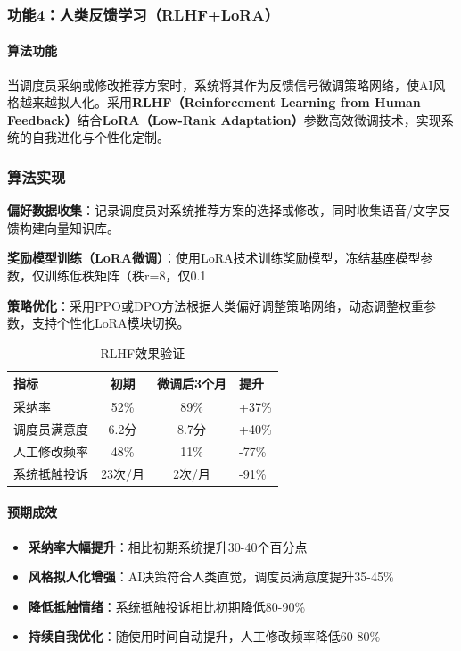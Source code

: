 \documentclass[12pt,a4paper]{article}
\begin{document}
\subsubsection{功能4：人类反馈学习（RLHF+LoRA）}

\paragraph{算法功能}

当调度员采纳或修改推荐方案时，系统将其作为反馈信号微调策略网络，使AI风格越来越拟人化。采用\textbf{RLHF（Reinforcement Learning from Human Feedback）}结合\textbf{LoRA（Low-Rank Adaptation）}参数高效微调技术，实现系统的自我进化与个性化定制。

\subsubsection{算法实现}

\textbf{偏好数据收集}：记录调度员对系统推荐方案的选择或修改，同时收集语音/文字反馈构建向量知识库。

\textbf{奖励模型训练（LoRA微调）}：使用LoRA技术训练奖励模型，冻结基座模型参数，仅训练低秩矩阵（秩r=8，仅0.1%

\textbf{策略优化}：采用PPO或DPO方法根据人类偏好调整策略网络，动态调整权重参数，支持个性化LoRA模块切换。

\begin{table}[h]
\centering
\begin{tabular}{lccl}
\toprule
\textbf{指标} & \textbf{初期} & \textbf{微调后3个月} & \textbf{提升} \\
\midrule
采纳率 & 52\% & 89\% & +37\% \\
调度员满意度 & 6.2分 & 8.7分 & +40\% \\
人工修改频率 & 48\% & 11\% & -77\% \\
系统抵触投诉 & 23次/月 & 2次/月 & -91\% \\
\bottomrule
\end{tabular}
\caption{RLHF效果验证}
\end{table}

\paragraph{预期成效}

\begin{itemize}[leftmargin=*]
    \item[\checkmark] \textbf{采纳率大幅提升}：相比初期系统提升30-40个百分点
    \item[\checkmark] \textbf{风格拟人化增强}：AI决策符合人类直觉，调度员满意度提升35-45\%
    \item[\checkmark] \textbf{降低抵触情绪}：系统抵触投诉相比初期降低80-90\%
    \item[\checkmark] \textbf{持续自我优化}：随使用时间自动提升，人工修改频率降低60-80\%
\end{itemize}
\end{document}
